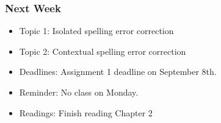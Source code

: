 \documentclass{beamer}
\begin{document}
\begin{frame}
\frametitle{Next Week}
\begin{itemize}
\item Topic 1: Isolated spelling error correction
\item Topic 2: Contextual spelling error correction
\item Deadlines: Assignment 1 deadline on September 8th.
\item Reminder: No class on Monday.
\item Readings: Finish reading Chapter 2
\end{itemize}
\end{frame}
\end{document}
